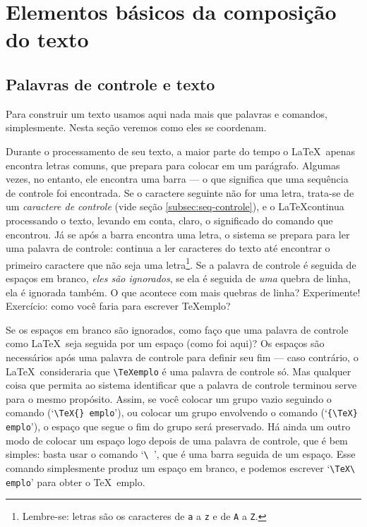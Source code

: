 \section{Elementos básicos da composição do texto}

\subsection{Palavras de controle e texto}

Para construir um texto usamos aqui nada mais que palavras e comandos,
simplesmente. Nesta seção veremos como eles se coordenam.

Durante o processamento de seu texto, a maior parte do tempo o
\LaTeX\ apenas encontra letras comuns, que prepara para colocar em um
parágrafo. Algumas vezes, no entanto, ele encontra uma barra --- o que
significa que uma sequência de controle foi encontrada. Se o caractere
seguinte não for uma letra, trata-se de um 
\emph{caractere de controle} (vide seção \ref{subsec:seq-controle}), e
o \LaTeX continua processando o texto, levando em conta, claro, o
significado do comando que encontrou. Já se após a barra encontra uma
letra, o sistema se prepara para ler uma palavra de controle: continua
a ler caracteres do texto até encontrar o primeiro caractere que não
seja uma letra\footnote{Lembre-se: letras são os caracteres de
  \texttt{a} a \texttt{z} e de \texttt{A} a \texttt{Z}.}. Se a palavra
de controle é seguida de espaços em branco, \emph{eles são
  ignorados}, se ela é seguida de \emph{uma} quebra de linha, ela é
ignorada também. O que acontece com mais quebras de linha?
Experimente! Exercício: como você faria para escrever \TeX emplo?

Se os espaços em branco são ignorados, como faço que uma palavra
de controle como \LaTeX\ seja seguida por um espaço (como foi aqui)?
Os espaços são necessários após uma palavra de controle para definir
seu fim --- caso contrário, o \LaTeX\ consideraria que \verb'\TeXemplo' é
uma palavra de controle só. Mas qualquer coisa que permita ao sistema
identificar que a palavra de controle terminou serve para o mesmo
propósito. Assim, se você colocar um grupo vazio seguindo o comando
(`\verb'\TeX{} emplo''), ou colocar um grupo envolvendo o comando
(`\verb'{\TeX} emplo''), o espaço que segue o fim do grupo será
preservado. Há ainda um outro modo de colocar um espaço logo depois de
uma palavra de controle, que é bem simples: basta usar o comando
`\verb'\ '', que é uma barra seguida de um espaço. Esse comando
simplesmente produz um espaço em branco, e podemos escrever
`\verb'\TeX\ emplo'' para obter o \TeX\ emplo.

